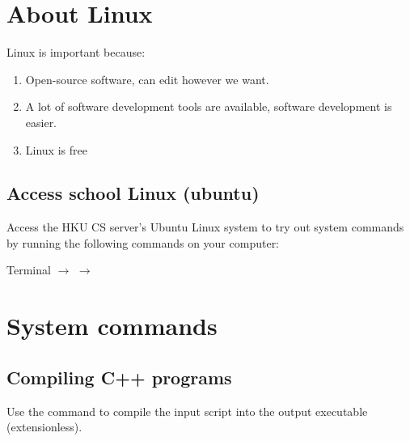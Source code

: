 \documentclass{article}
\begin{document}



\section{About Linux}
Linux is important because:
\begin{enumerate}
    \item Open-source software, can edit however we want.
    \item A lot of software development tools are available, software development is easier.
    \item Linux is free
\end{enumerate}

\subsection{Access school Linux (ubuntu)}
Access the HKU CS server's Ubuntu Linux system to try out system commands by running the following commands on your computer:

Terminal $\to$  $\to$ 

\section{System commands}

\subsection*{Compiling C++ programs}
Use the command  to compile the input script into the output executable (extensionless).
\end{document}
